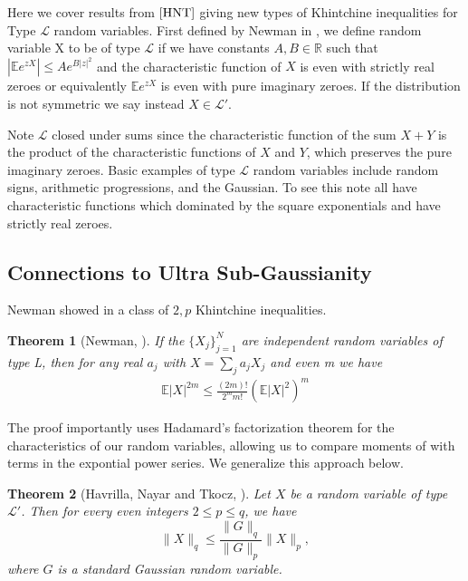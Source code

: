 \documentclass[10pt]{article}
\newcommand{\E}{\mathbb{E}}
\newcommand{\1}{\textbf{1}}
\newcommand{\R}{\mathbb{R}}
\newtheorem{theorem}{Theorem}[subsection]
\theoremstyle{remark}
\theoremstyle{definition}
\begin{document}
Here we cover results from $\cite{HNT}$ giving new types of Khintchine inequalities for Type $\mathcal{L}$ random variables. First defined by Newman in \cite{N}, we define random variable X to be of type $\mathcal{L}$ if we have constants $A,B \in \R$ such that $|\E e^{z X}| \leq A e^{B|z|^2}$ and the characteristic function of $X$ is even with strictly real zeroes or equivalently $\E e^{zX}$ is even with pure imaginary zeroes. If the distribution is not symmetric we say instead $X \in \mathcal{L}'$. 

Note $\mathcal{L}$ closed under sums since the characteristic function of the sum $X+Y$ is the product of the characteristic functions of $X$ and $Y$, which preserves the pure imaginary zeroes. Basic examples of type $\mathcal{L}$ random variables include random signs, arithmetic progressions, and the Gaussian. To see this note all have characteristic functions which dominated by the square exponentials and have strictly real zeroes. 

\subsection{Connections to Ultra Sub-Gaussianity}

Newman showed in \cite{N} a class of $2,p$ Khintchine inequalities.

\begin{theorem}[Newman, \cite{N}]\label{thm:L1}
	If the $\{X_j\}_{j=1}^N$ are independent random variables of type L, then for any real $a_j$ with $X= \sum_j a_j X_j$ and even m we have
	\begin{align*}
		\E|X|^{2m} \leq \frac{(2m)!}{2^mm!}(\E|X|^2)^m
	\end{align*}
\end{theorem} The proof importantly uses Hadamard's factorization theorem for the characteristics of our random variables, allowing us to compare moments of with terms in the expontial power series. We generalize this approach below.

\begin{theorem}[Havrilla, Nayar and Tkocz, \cite{HNT}]\label{thm:L2}
Let $X$ be a random variable of type $\mathcal{L}'$. Then for every even integers $2 \leq p \leq q$, we have
\begin{equation*}\label{eq:mom-comp}
\|X\|_q \leq \frac{\|G\|_q}{\|G\|_p}\|X\|_p,
\end{equation*}
where $G$ is a standard Gaussian random variable.
\end{theorem}
\end{document}
